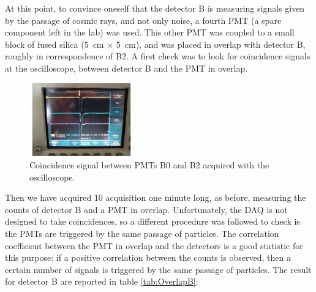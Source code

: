 At this point, to convince oneself that the detector B is measuring signals given by the passage of cosmic rays, and not only noise, a fourth PMT (a spare component left in the lab) was used. This other PMT was coupled to a small block of fused silica (\SI{5}{\centi \meter} $\times$ \SI{5}{\centi \meter}), and was placed in overlap with detector B, roughly in correspondence of B2. A first check was to look for coincidence signals at the oscilloscope, between detector B and the PMT in overlap.

\begin{figure}[!ht]
\centering
\includegraphics[width = 0.4\textwidth]{Analysis/Coincidence.pdf} 
\caption{Coincidence signal between PMTs B0 and B2 acquired with the oscilloscope.}
\label{fig:CoincidenceSignal}
\end{figure}

Then we have acquired 10 acquisition one minute long, as before, measuring the counts of detector B and a PMT in overlap. Unfortunately, the DAQ is not designed to take coincidences, so a different procedure was followed to check is the PMTs are triggered by the same passage of particles. 
The correlation coefficient between the PMT in overlap and the detectors is a good statistic for this purpose: if a positive correlation between the counts is observed, then a certain number of signals is triggered by the same passage of particles. The result for detector B are reported in table \ref{tab:OverlapB}:

